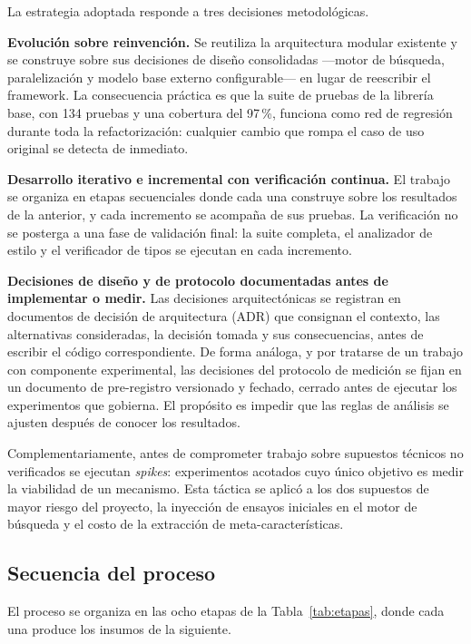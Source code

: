 \documentclass[12pt,letterpaper,oneside]{article}
\begin{document}
La estrategia adoptada responde a tres decisiones metodológicas.

\textbf{Evolución sobre reinvención.} Se reutiliza la arquitectura modular existente y se
construye sobre sus decisiones de diseño consolidadas —motor de búsqueda, paralelización y
modelo base externo configurable— en lugar de reescribir el framework. La consecuencia
práctica es que la suite de pruebas de la librería base, con 134 pruebas y una cobertura
del 97\,\%, funciona como red de regresión durante toda la refactorización: cualquier
cambio que rompa el caso de uso original se detecta de inmediato.

\textbf{Desarrollo iterativo e incremental con verificación continua.} El trabajo se
organiza en etapas secuenciales donde cada una construye sobre los resultados de la
anterior, y cada incremento se acompaña de sus pruebas. La verificación no se posterga a
una fase de validación final: la suite completa, el analizador de estilo y el verificador
de tipos se ejecutan en cada incremento.

\textbf{Decisiones de diseño y de protocolo documentadas antes de implementar o medir.}
Las decisiones arquitectónicas se registran en documentos de decisión de arquitectura
(ADR) que consignan el contexto, las alternativas consideradas, la decisión tomada y sus
consecuencias, antes de escribir el código correspondiente. De forma análoga, y por
tratarse de un trabajo con componente experimental, las decisiones del protocolo de
medición se fijan en un documento de pre-registro versionado y fechado, cerrado antes de
ejecutar los experimentos que gobierna. El propósito es impedir que las reglas de análisis
se ajusten después de conocer los resultados.

Complementariamente, antes de comprometer trabajo sobre supuestos técnicos no verificados
se ejecutan \textit{spikes}: experimentos acotados cuyo único objetivo es medir la
viabilidad de un mecanismo. Esta táctica se aplicó a los dos supuestos de mayor riesgo del
proyecto, la inyección de ensayos iniciales en el motor de búsqueda y el costo de la
extracción de meta-características.

\subsection{Secuencia del proceso}

El proceso se organiza en las ocho etapas de la
Tabla~\ref{tab:etapas}, donde cada una produce los insumos de la siguiente.
\end{document}
